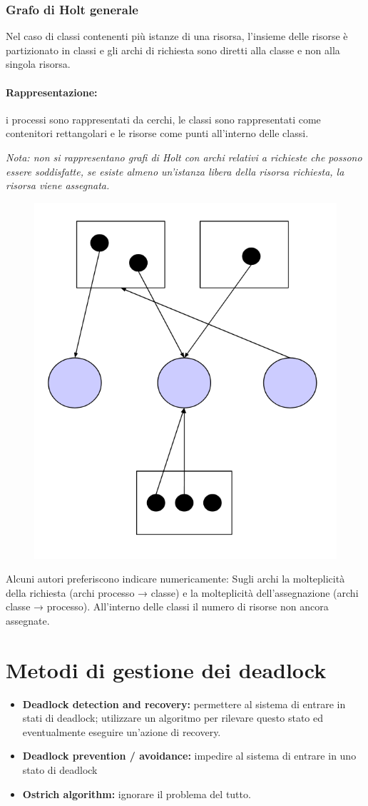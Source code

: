 \subsubsection{Grafo di Holt generale}
Nel caso di classi contenenti più istanze di una risorsa, l'insieme delle risorse è partizionato in classi e gli archi di richiesta sono diretti alla classe e non alla singola risorsa.

\paragraph{Rappresentazione:} i processi sono rappresentati da cerchi, le classi sono rappresentati come contenitori rettangolari
e le risorse come punti all'interno delle classi.

\textit{Nota: non si rappresentano grafi di Holt con archi relativi a richieste che possono essere soddisfatte, se esiste almeno un'istanza libera della risorsa richiesta, la risorsa viene
assegnata.}

\begin{figure} [h]
    \centering
    \includegraphics[width=0.2\linewidth]{Images/Screenshot 2024-12-30 at 18-04-17 so-04-risorse - so-04-risorse.pdf.png}
\end{figure}

Alcuni autori preferiscono indicare numericamente:
Sugli archi la molteplicità della richiesta
(archi processo → classe) e la molteplicità dell'assegnazione
(archi classe → processo).
All'interno delle classi il numero di risorse non ancora
assegnate.


\section{Metodi di gestione dei deadlock}

\begin{itemize}
    \item \textbf{Deadlock detection and recovery:} permettere al sistema di entrare in stati di deadlock; utilizzare un algoritmo per rilevare questo stato ed eventualmente eseguire un'azione di recovery.
    \item \textbf{Deadlock prevention / avoidance:} impedire al sistema di entrare in uno stato di deadlock
    \item \textbf{Ostrich algorithm:} ignorare il problema del tutto.
\end{itemize}

